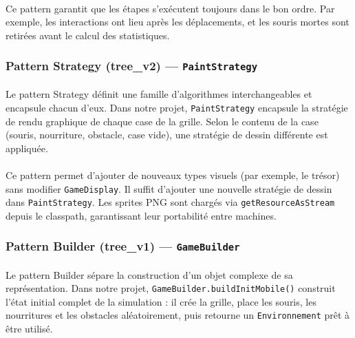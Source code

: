 \paragraph{} Ce pattern garantit que les étapes s'exécutent toujours dans le bon ordre. Par exemple, les interactions ont lieu après les déplacements, et les souris mortes sont retirées avant le calcul des statistiques.

\subsubsection{Pattern Strategy (tree\_v2) --- \texttt{PaintStrategy}}

\paragraph{} Le pattern Strategy définit une famille d'algorithmes interchangeables et encapsule chacun d'eux. Dans notre projet, \texttt{PaintStrategy} encapsule la stratégie de rendu graphique de chaque case de la grille. Selon le contenu de la case (souris, nourriture, obstacle, case vide), une stratégie de dessin différente est appliquée.

\paragraph{} Ce pattern permet d'ajouter de nouveaux types visuels (par exemple, le trésor) sans modifier \texttt{GameDisplay}. Il suffit d'ajouter une nouvelle stratégie de dessin dans \texttt{PaintStrategy}. Les sprites PNG sont chargés via \texttt{getResourceAsStream} depuis le classpath, garantissant leur portabilité entre machines.

\subsubsection{Pattern Builder (tree\_v1) --- \texttt{GameBuilder}}

\paragraph{} Le pattern Builder sépare la construction d'un objet complexe de sa représentation. Dans notre projet, \texttt{GameBuilder.buildInitMobile()} construit l'état initial complet de la simulation : il crée la grille, place les souris, les nourritures et les obstacles aléatoirement, puis retourne un \texttt{Environnement} prêt à être utilisé.

